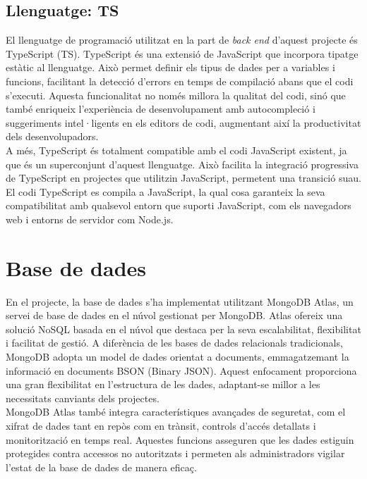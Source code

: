 \documentclass[a4paper,12pt,twoside]{ThesisStyle}
\begin{document}
\subsection{Llenguatge: TS}
\label{subsec:Llenguatge: TS}

El llenguatge de programació utilitzat en la part de \textit{back end} d'aquest projecte és TypeScript (TS). TypeScript és una extensió de JavaScript que incorpora tipatge estàtic al llenguatge. Això permet definir els tipus de dades per a variables i funcions, facilitant la detecció d'errors en temps de compilació abans que el codi s'executi. Aquesta funcionalitat no només millora la qualitat del codi, sinó que també enriqueix l'experiència de desenvolupament amb autocompleció i suggeriments intel·ligents en els editors de codi, augmentant així la productivitat dels desenvolupadors.\\

A més, TypeScript és totalment compatible amb el codi JavaScript existent, ja que és un superconjunt d'aquest llenguatge. Això facilita la integració progressiva de TypeScript en projectes que utilitzin JavaScript, permetent una transició suau. El codi TypeScript es compila a JavaScript, la qual cosa garanteix la seva compatibilitat amb qualsevol entorn que suporti JavaScript, com els navegadors web i entorns de servidor com Node.js.



\section{Base de dades}
\label{subsec: Base de dades}


En el projecte, la base de dades s'ha implementat utilitzant MongoDB Atlas, un servei de base de dades en el núvol gestionat per MongoDB. Atlas ofereix una solució NoSQL basada en el núvol que destaca per la seva escalabilitat, flexibilitat i facilitat de gestió. A diferència de les bases de dades relacionals tradicionals, MongoDB adopta un model de dades orientat a documents, emmagatzemant la informació en documents BSON (Binary JSON). Aquest enfocament proporciona una gran flexibilitat en l'estructura de les dades, adaptant-se millor a les necessitats canviants dels projectes.\\

MongoDB Atlas també integra característiques avançades de seguretat, com el xifrat de dades tant en repòs com en trànsit, controls d'accés detallats i monitorització en temps real. Aquestes funcions asseguren que les dades estiguin protegides contra accessos no autoritzats i permeten als administradors vigilar l'estat de la base de dades de manera eficaç.\\
\end{document}
